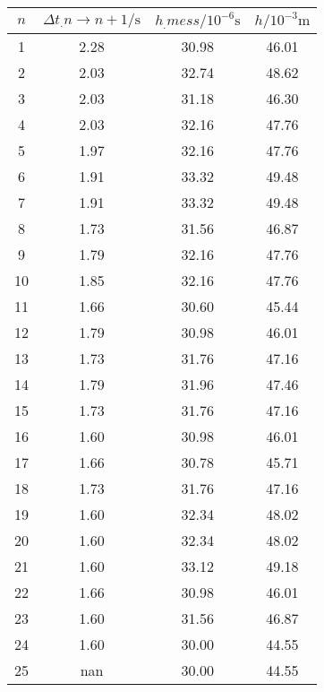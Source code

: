 \label{tab:tabHerz}
	\begin{tabular}{S[table-format=1.0]S[table-format=1.2]S[table-format=2.2]S[table-format=2.2]}
		\toprule
		{$n$} & {$\Delta t_.{n\rightarrow n+1}/\si{\second}$} &{$h_.{mess}/10^{-6}\si{\second}$} & {$h/10^{-3}\si{\metre}$} \\
		 & 2.28 & 30.98 & 46.01 \\
		2 & 2.03 & 32.74 & 48.62 \\
		3 & 2.03 & 31.18 & 46.30 \\
		4 & 2.03 & 32.16 & 47.76 \\
		5 & 1.97 & 32.16 & 47.76 \\
		6 & 1.91 & 33.32 & 49.48 \\
		7 & 1.91 & 33.32 & 49.48 \\
		8 & 1.73 & 31.56 & 46.87 \\
		9 & 1.79 & 32.16 & 47.76 \\
		10 & 1.85 & 32.16 & 47.76 \\
		11 & 1.66 & 30.60 & 45.44 \\
		12 & 1.79 & 30.98 & 46.01 \\
		13 & 1.73 & 31.76 & 47.16 \\
		14 & 1.79 & 31.96 & 47.46 \\
		15 & 1.73 & 31.76 & 47.16 \\
		16 & 1.60 & 30.98 & 46.01 \\
		17 & 1.66 & 30.78 & 45.71 \\
		18 & 1.73 & 31.76 & 47.16 \\
		19 & 1.60 & 32.34 & 48.02 \\
		20 & 1.60 & 32.34 & 48.02 \\
		21 & 1.60 & 33.12 & 49.18 \\
		22 & 1.66 & 30.98 & 46.01 \\
		23 & 1.60 & 31.56 & 46.87 \\
		24 & 1.60 & 30.00 & 44.55 \\
		25 & nan & 30.00 & 44.55 \\
		\bottomrule
	\end{tabular}
